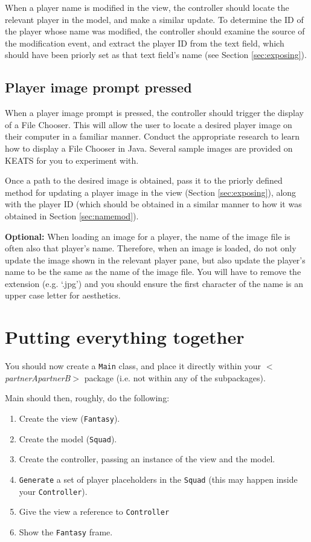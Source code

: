 \documentclass[11pt]{article}
\begin{document}
When a player name is modified in the view, the controller should locate the relevant player in the model, and make a similar update. To determine the ID of the player whose name was modified, the controller should examine the source of the modification event, and extract the player ID from the text field, which should have been priorly set as that text field's name (see Section \ref{sec:exposing}).

\subsection{Player image prompt pressed}

When a player image prompt is pressed, the controller should trigger the display of a File Chooser. This will allow the user to locate a desired player image on their computer in a familiar manner. Conduct the appropriate research to learn how to display a File Chooser in Java. Several sample images are provided on KEATS for you to experiment with.

Once a path to the desired image is obtained, pass it to the priorly defined method for updating a player image in the view (Section \ref{sec:exposing}), along with the player ID (which should be obtained in a similar manner to how it was obtained in Section \ref{sec:namemod}). 

\textbf{Optional:} When loading an image for a player, the name of the image file is often also that player's name. Therefore, when an image is loaded, do not only update the image shown in the relevant player pane, but also update the player's name to be the same as the name of the image file. You will have to remove the extension (e.g. `.jpg') and you should ensure the first character of the name is an upper case letter for aesthetics.

\section{Putting everything together}

You should now create a \texttt{Main} class, and place it directly within your $<$\emph{partnerApartnerB}$>$ package (i.e. not within any of the subpackages). 

Main should then, roughly, do the following:

\begin{enumerate}

	\item Create the view (\texttt{Fantasy}).
	\item Create the model (\texttt{Squad}).
	\item Create the controller, passing an instance of the view and the model.
	\item \texttt{Generate} a set of player placeholders in the \texttt{Squad} (this may happen inside your \texttt{Controller}).
	\item Give the view a reference to \texttt{Controller}
	\item Show the \texttt{Fantasy} frame.

\end{enumerate}
\end{document}
